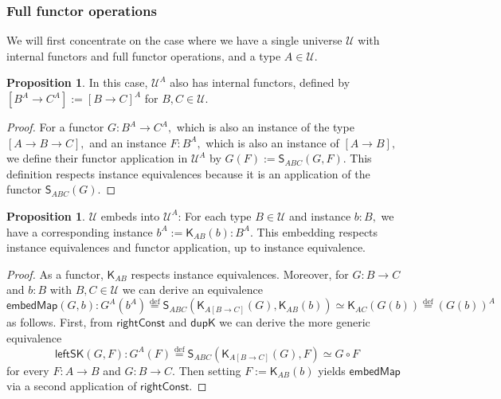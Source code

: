 \documentclass[a4paper]{article}
\theoremstyle{definition}
\newtheorem{proposition}[definition]{Proposition}
\theoremstyle{remark}
\renewcommand{\equiv}{\simeq}
\newcommand{\U}{\mathcal{U}}
\newcommand{\nm}{\mathsf}
\newcommand{\combinator}{\nm}
\newcommand{\constFun}{\combinator{K}}
\newcommand{\revSubstFun}{\combinator{S}}
\newcommand{\eqDef}{\overset{\text{def}}{=}}
\begin{document}
\subsubsection*{Full functor operations}

We will first concentrate on the case where we have a single universe $\U$ with internal
functors and full functor operations, and a type $A \in \U.$

\begin{proposition}
  \label{prp:fun-univ-full}
  In this case, $\U^A$ also has internal functors, defined by $[B^A \to C^A] := [B \to C]^A$
  for $B,C \in \U.$
\end{proposition}
\vspace{-1ex}
\begin{proof}
  For a functor $G : B^A \to C^A,$ which is also an instance of the type $[A \to B \to C],$
  and an instance $F : B^A,$ which is also an instance of $[A \to B],$ we define their functor
  application in $\U^A$ by $G(F) := \revSubstFun_{ABC}(G,F).$ This definition
  respects instance equivalences because it is an application of the functor
  $\revSubstFun_{ABC}(G).$
\end{proof}

\begin{proposition}
  \label{prp:fun-univ-embed-map}
  $\U$ embeds into $\U^A$: For each type $B \in \U$ and instance $b : B,$ we have
  a corresponding instance $b^A := \constFun_{AB}(b) : B^A.$ This embedding
  respects instance equivalences and functor application, up to instance equivalence.
\end{proposition}
\vspace{-1ex}
\begin{proof}
  As a functor, $\constFun_{AB}$ respects instance equivalences.
  Moreover, for $G : B \to C$ and $b : B$ with $B,C \in \U$ we can derive an equivalence
  \[\nm{embedMap}(G,b) : G^A(b^A) \eqDef \revSubstFun_{ABC}(\constFun_{A[B{\to}C]}(G),\constFun_{AB}(b)) \equiv
    \constFun_{AC}(G(b)) \eqDef (G(b))^A\]
  as follows.
  First, from $\nm{rightConst}$ and $\nm{dupK}$ we can derive the more generic equivalence
  \[\nm{leftSK}(G,F) : G^A(F) \eqDef \revSubstFun_{ABC}(\constFun_{A[B{\to}C]}(G),F) \equiv G \circ F\]
  for every $F : A \to B$ and $G : B \to C.$
  Then setting $F := \constFun_{AB}(b)$ yields $\nm{embedMap}$ via a second application
  of $\nm{rightConst}.$
\end{proof}
\end{document}
